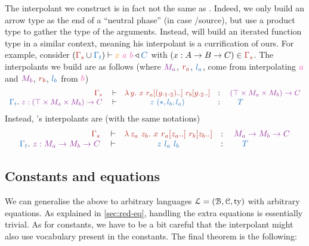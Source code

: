 \documentclass[a4paper,UKenglish,cleveref, autoref, thm-restate]{lipics-v2021}
\begin{document}
\begin{remark}
The interpolant we construct is in fact not
the same as \Cubric. Indeed, we only build
an arrow type as the end of a ``neutral phase'' (in case 
/source), but use a product type to
gather the type of the arguments. Instead, \Cubric will build an iterated
function type in a similar context, meaning his interpolant is a currification of
ours. For example, consider
\(\check{(\part{\Gamma_{s}}{\Gamma_{t}})}{\icol{x}~\ccol{a}~\ccol{b}}{\tcol{C}}\)
with \((x : A \to B \to C) \in \scol{\Gamma_{s}}\). The interpolants
we build are as follows (where \(\mcol{M_a}\), \(\scol{r_a}\), \(\tcol{l_a}\),
come from interpolating \(\ccol{a}\) and \(\mcol{M_b}\), \(\scol{r_b}\), \(\tcol{l_b}\)
from \(\ccol{b}\))
\[\begin{array}{rcl}
  \scol{\Gamma_{s}} \quad \vdash
    & \scol{\l y.~x~\subs{r_a}{(\proj{2}{\proj{1}{y}})..} ~ \subs{r_b}{\proj{2}{y}..}}
    & \ty \quad \mcol{(\top \times M_a \times M_b) \to C} \\
  \tcol{\Gamma_{t}}.~\mcol{z :(\top \times M_a \times M_b) \to C} \quad \vdash
    & \tcol{z~(\st,l_b,l_a)}
    & \ty \qquad \tcol{T}
  \end{array}\]
Instead, \Cubric's interpolants are (with the same notations)
\[\begin{array}{rcl}
  \scol{\Gamma_{s}} \quad \vdash
    & \scol{\l z_a~z_b.~x~\subs{r_a}{z_a..} ~ \subs{r_b}{z_b..}}
    & \ty \quad \mcol{M_a \to M_b \to C} \\
  \tcol{\Gamma_{t}}.~\mcol{z : M_a \to M_b \to C} \quad \vdash
    & \tcol{z~l_a~l_b}
    & \ty \qquad \tcol{T}
  \end{array}\]
\end{remark}

\subsection{Constants and equations}

We can generalise the above to arbitrary languages \(\mathcal{L} = (\mathcal{B},\mathcal{C},\operatorname{ty})\)
with arbitrary equations.
As explained in \cref{sec:red-eq}, handling the extra equations is essentially
trivial. As for constants, we have to be a bit careful that
the interpolant might also use vocabulary present in the constants. The
final theorem is the following:
\end{document}
